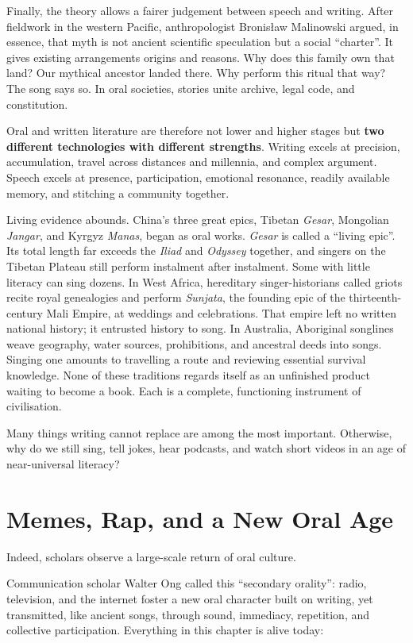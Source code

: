 Finally, the theory allows a fairer judgement between speech and writing. After fieldwork in the western Pacific, anthropologist Bronisław Malinowski argued, in essence, that myth is not ancient scientific speculation but a social ``charter''. It gives existing arrangements origins and reasons. Why does this family own that land? Our mythical ancestor landed there. Why perform this ritual that way? The song says so. In oral societies, stories unite archive, legal code, and constitution.

Oral and written literature are therefore not lower and higher stages but \textbf{two different technologies with different strengths}. Writing excels at precision, accumulation, travel across distances and millennia, and complex argument. Speech excels at presence, participation, emotional resonance, readily available memory, and stitching a community together.

Living evidence abounds. China's three great epics, Tibetan \emph{Gesar}, Mongolian \emph{Jangar}, and Kyrgyz \emph{Manas}, began as oral works. \emph{Gesar} is called a ``living epic''. Its total length far exceeds the \emph{Iliad} and \emph{Odyssey} together, and singers on the Tibetan Plateau still perform instalment after instalment. Some with little literacy can sing dozens. In West Africa, hereditary singer-historians called griots recite royal genealogies and perform \emph{Sunjata}, the founding epic of the thirteenth-century Mali Empire, at weddings and celebrations. That empire left no written national history; it entrusted history to song. In Australia, Aboriginal songlines weave geography, water sources, prohibitions, and ancestral deeds into songs. Singing one amounts to travelling a route and reviewing essential survival knowledge. None of these traditions regards itself as an unfinished product waiting to become a book. Each is a complete, functioning instrument of civilisation.

Many things writing cannot replace are among the most important. Otherwise, why do we still sing, tell jokes, hear podcasts, and watch short videos in an age of near-universal literacy?

\section{Memes, Rap, and a New Oral Age}
Indeed, scholars observe a large-scale return of oral culture.

Communication scholar Walter Ong called this ``secondary orality'': radio, television, and the internet foster a new oral character built on writing, yet transmitted, like ancient songs, through sound, immediacy, repetition, and collective participation. Everything in this chapter is alive today:

